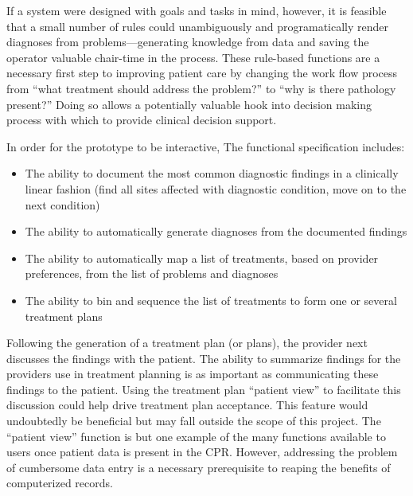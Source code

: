 \documentclass[11pt]{article}
\begin{document}
If a system were designed with goals and tasks in mind, however, it is feasible that a small number of rules could unambiguously and programatically render diagnoses from problems---generating knowledge from data and saving the operator valuable chair-time in the process. These rule-based functions are a necessary first step to improving patient care by changing the work flow process from ``what treatment should address the problem?'' to ``why is there pathology present?'' Doing so allows a potentially valuable hook into decision making process with which to provide clinical decision support.


In order for the prototype to be interactive, The functional specification includes:

\begin{itemize}
\item The ability to document the most common diagnostic findings in a clinically linear fashion (find all sites affected with diagnostic condition, move on to the next condition)
\item The ability to automatically generate diagnoses from the documented findings
\item The ability to automatically map a list of treatments, based on provider preferences, from the list of problems and diagnoses
\item The ability to bin and sequence the list of treatments to form one or several treatment plans
\end{itemize}

Following the generation of a treatment plan (or plans), the provider next discusses the findings with the patient. The ability to summarize findings for the providers use in treatment planning is as important as communicating these findings to the patient. Using the treatment plan ``patient view'' to facilitate this discussion could help drive treatment plan acceptance. This feature would undoubtedly be beneficial but may fall outside the scope of this project. The ``patient view'' function is but one example of the many functions available to users once patient data is present in the CPR. However, addressing the problem of cumbersome data entry is a necessary prerequisite to reaping the benefits of computerized records.
\end{document}
